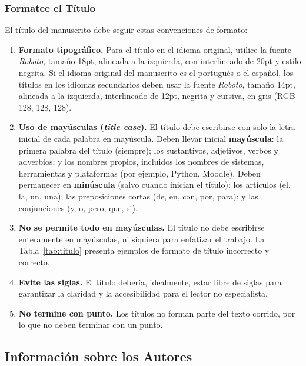 \documentclass[spanish]{rbie2026}%
\begin{document}
\subsubsection{Formatee el Título} \label{sec:formatacao_titulo}

El título del manuscrito debe seguir estas convenciones de formato:

\begin{enumerate}
  \item \textbf{Formato tipográfico.} Para el título en el idioma original, utilice la fuente \textit{Roboto}, tamaño 18pt, alineada a la izquierda, con interlineado de 20pt y estilo negrita. Si el idioma original del manuscrito es el portugués o el español, los títulos en los idiomas secundarios deben usar la fuente \textit{Roboto}, tamaño 14pt, alineada a la izquierda, interlineado de 12pt, negrita y cursiva, en gris (RGB 128, 128, 128).

  \item \textbf{Uso de mayúsculas (\textit{title case}).} El título debe escribirse con solo la letra inicial de cada palabra en mayúscula. Deben llevar inicial \textbf{mayúscula}: la primera palabra del título (siempre); los sustantivos, adjetivos, verbos y adverbios; y los nombres propios, incluidos los nombres de sistemas, herramientas y plataformas (por ejemplo, Python, Moodle). Deben permanecer en \textbf{minúscula} (salvo cuando inician el título): los artículos (el, la, un, una); las preposiciones cortas (de, en, con, por, para); y las conjunciones (y, o, pero, que, si).

  \item \textbf{No se permite todo en mayúsculas.} El título no debe escribirse enteramente en mayúsculas, ni siquiera para enfatizar el trabajo. La Tabla~\ref{tab:titulo} presenta ejemplos de formato de título incorrecto y correcto.

  \item \textbf{Evite las siglas.} El título debería, idealmente, estar libre de siglas para garantizar la claridad y la accesibilidad para el lector no especialista.

  \item \textbf{No termine con punto.} Los títulos no forman parte del texto corrido, por lo que no deben terminar con un punto.
\end{enumerate}



\subsection{Información sobre los Autores}
\end{document}
